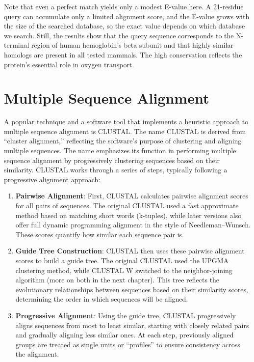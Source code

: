 Note that even a perfect match yields only a modest E-value here. A 21-residue query can accumulate only a limited alignment score, and the E-value grows with the size of the searched database, so the exact value depends on which database we search. Still, the results show that the query sequence corresponds to the N-terminal region of human hemoglobin’s beta subunit and that highly similar homologs are present in all tested mammals. The high conservation reflects the protein’s essential role in oxygen transport.

\section{Multiple Sequence Alignment}

A popular technique and a software tool that implements a heuristic approach to multiple sequence alignment is CLUSTAL. 
The name CLUSTAL is derived from ``cluster alignment,'' reflecting the software's purpose of clustering and aligning multiple sequences. The name emphasizes its function in performing multiple sequence alignment by progressively clustering sequences based on their similarity. CLUSTAL works through a series of steps, typically following a progressive alignment approach:

\begin{enumerate}
\item \textbf{Pairwise Alignment}: First, CLUSTAL calculates pairwise alignment scores for all pairs of sequences. The original CLUSTAL used a fast approximate method based on matching short words (k-tuples), while later versions also offer full dynamic programming alignment in the style of Needleman--Wunsch. These scores quantify how similar each sequence pair is.
\item \textbf{Guide Tree Construction}: CLUSTAL then uses these pairwise alignment scores to build a guide tree. The original CLUSTAL used the UPGMA clustering method, while CLUSTAL W switched to the neighbor-joining algorithm (more on both in the next chapter). This tree reflects the evolutionary relationships between sequences based on their similarity scores, determining the order in which sequences will be aligned.
\item \textbf{Progressive Alignment}: Using the guide tree, CLUSTAL progressively aligns sequences from most to least similar, starting with closely related pairs and gradually aligning less similar ones. At each step, previously aligned groups are treated as single units or ``profiles'' to ensure consistency across the alignment.
\end{enumerate}

